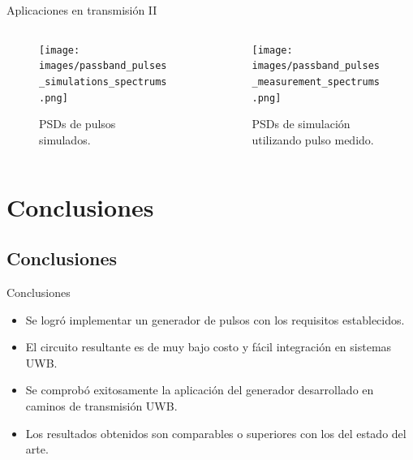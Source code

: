 \documentclass{beamer}
\begin{document}
\begin{frame}{Aplicaciones en transmisión II}

    \begin{columns}[T]
        \begin{column}{0.5\textwidth}
            \begin{figure}[b]
                \centering
                \texttt{[image: images/passband\_pulses\_simulations\_spectrums.png]}
                \label{fig:passband_spectrums_simulation}
                \caption{PSDs de pulsos simulados.}
            \end{figure}
        \end{column}
        \begin{column}{0.5\textwidth}
            \begin{figure}[b]
                \centering
                \texttt{[image: images/passband\_pulses\_measurement\_spectrums.png]}
                \label{fig:passband_spectrums_measurement}
                \caption{PSDs de simulación utilizando pulso medido.}
            \end{figure}
        \end{column}
    \end{columns}

\end{frame}

\section{Conclusiones}

\subsection{Conclusiones}

\begin{frame}{Conclusiones}
    \begin{itemize}
        \item Se logró implementar un generador de pulsos con los requisitos
            establecidos.
        \item El circuito resultante es de muy bajo costo y fácil integración en
            sistemas UWB.
        \item Se comprobó exitosamente la aplicación del generador desarrollado
            en caminos de transmisión UWB.
        \item Los resultados obtenidos son comparables o superiores con los del
            estado del arte.
    \end{itemize}
\end{frame}
\end{document}
